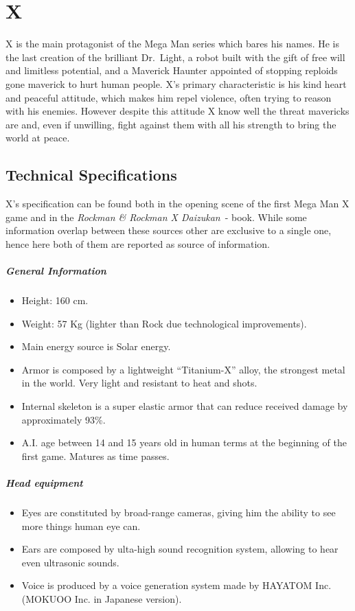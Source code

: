 \chapter{X}\label{char:X}
X is the main protagonist of the Mega Man series which bares his names. He is the last creation of the brilliant Dr.~Light, a robot built with the gift of free will and limitless potential, and a Maverick Haunter appointed of stopping reploids gone maverick to hurt human people. 
X's primary characteristic is his kind heart and peaceful attitude, which makes him repel violence, often trying to reason with his enemies. However despite this attitude X know well the threat mavericks are and, even if unwilling, fight against them with all his strength to bring the world at peace.

\section{Technical Specifications}
X's specification can be found both in the opening scene of the first Mega Man X game and in the \emph{Rockman \& Rockman X Daizukan}~\cite{book:RRXD}-\cite{X_specs_translated} book. While some information overlap between these sources other are exclusive to a single one, hence here both of them are reported as source of information.

\paragraph{General Information}
\begin{itemize}
	\item Height: 160 cm.
	\item Weight: 57 Kg (lighter than Rock due technological improvements).
	\item Main energy source is Solar energy.
	\item Armor is composed by a lightweight ``Titanium-X'' alloy, the strongest metal in the world. Very light and resistant to heat and shots.
	\item Internal skeleton is a super elastic armor that can reduce received damage by approximately 93\%.
	\item A.I. age between 14 and 15 years old in human terms at the beginning of the first game. Matures as time passes.
\end{itemize}

\paragraph{Head equipment}
\begin{itemize}
	\item Eyes are constituted by broad-range cameras, giving him the ability to see more things human eye can.
	\item Ears are composed by ulta-high sound recognition system, allowing to hear even ultrasonic sounds.
	\item Voice is produced by a voice generation system made by HAYATOM Inc. (MOKUOO Inc. in Japanese version). 
\end{itemize}

